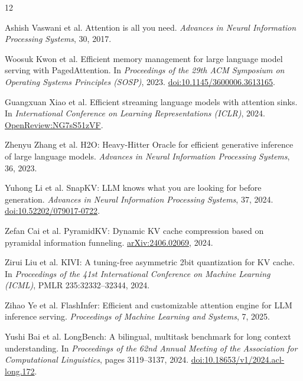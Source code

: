 \begingroup
\small
\begin{thebibliography}{12}
\setlength{\itemsep}{0.45em}
\setlength{\parsep}{0pt}

Ashish Vaswani et al.
\newblock Attention is all you need.
\newblock \emph{Advances in Neural Information Processing Systems}, 30, 2017.

Woosuk Kwon et al.
\newblock Efficient memory management for large language model serving with PagedAttention.
\newblock In \emph{Proceedings of the 29th ACM Symposium on Operating Systems
Principles (SOSP)}, 2023.  \href{https://doi.org/10.1145/3600006.3613165}{doi:10.1145/3600006.3613165}.

Guangxuan Xiao et al.
\newblock Efficient streaming language models with attention sinks.
\newblock In \emph{International Conference on Learning Representations (ICLR)},
2024.  \href{https://openreview.net/forum?id=NG7sS51zVF}{OpenReview:NG7sS51zVF}.

Zhenyu Zhang et al.
\newblock H2O: Heavy-Hitter Oracle for efficient generative inference of large language models.
\newblock \emph{Advances in Neural Information Processing Systems}, 36, 2023.

Yuhong Li et al.
\newblock SnapKV: LLM knows what you are looking for before generation.
\newblock \emph{Advances in Neural Information Processing Systems}, 37, 2024.
\href{https://doi.org/10.52202/079017-0722}{doi:10.52202/079017-0722}.

Zefan Cai et al.
\newblock PyramidKV: Dynamic KV cache compression based on pyramidal information funneling.
\newblock \href{https://arxiv.org/abs/2406.02069}{arXiv:2406.02069}, 2024.

Zirui Liu et al.
\newblock KIVI: A tuning-free asymmetric 2bit quantization for KV cache.
\newblock In \emph{Proceedings of the 41st International Conference on Machine
Learning (ICML)}, PMLR 235:32332--32344, 2024.

Zihao Ye et al.
\newblock FlashInfer: Efficient and customizable attention engine for LLM inference serving.
\newblock \emph{Proceedings of Machine Learning and Systems}, 7, 2025.

Yushi Bai et al.
\newblock LongBench: A bilingual, multitask benchmark for long context understanding.
\newblock In \emph{Proceedings of the 62nd Annual Meeting of the Association for
Computational Linguistics}, pages 3119--3137, 2024.
\href{https://doi.org/10.18653/v1/2024.acl-long.172}{doi:10.18653/v1/2024.acl-long.172}.


\end{thebibliography}
